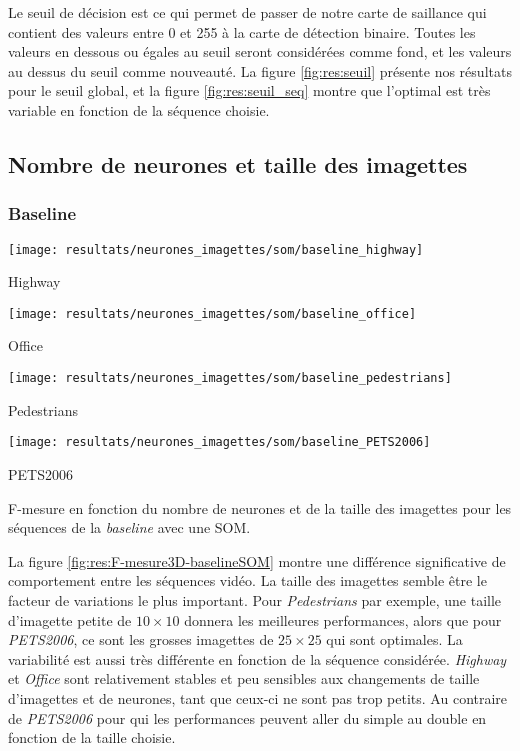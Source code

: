 	Le seuil de décision est ce qui permet de passer de notre carte de saillance qui contient des valeurs entre 0 et 255 à la carte de détection binaire. Toutes les valeurs en dessous ou égales au seuil seront considérées comme fond, et les valeurs au dessus du seuil comme nouveauté. La figure \ref{fig:res:seuil} présente nos résultats pour le seuil global, et la figure \ref{fig:res:seuil_seq} montre que l'optimal est très variable en fonction de la séquence choisie.

	\subsection{Nombre de neurones et taille des imagettes}

	\subsubsection{Baseline}

	\begin{figureth}
		\begin{subfigureth}{.45\textwidth}
			\texttt{[image: resultats/neurones\_imagettes/som/baseline\_highway]}\caption{Highway}
		\end{subfigureth}
		\begin{subfigureth}{.45\textwidth}
			\texttt{[image: resultats/neurones\_imagettes/som/baseline\_office]}\caption{Office}
		\end{subfigureth}
		\begin{subfigureth}{.45\textwidth}
			\texttt{[image: resultats/neurones\_imagettes/som/baseline\_pedestrians]}\caption{Pedestrians}
		\end{subfigureth}
		\begin{subfigureth}{.45\textwidth}
			\texttt{[image: resultats/neurones\_imagettes/som/baseline\_PETS2006]}\caption{PETS2006}
		\end{subfigureth}
		\caption[Nombre de neurones et de taille des imagettes, SOM/baseline]{F-mesure en fonction du nombre de neurones et de la taille des imagettes pour les séquences de la \textit{baseline} avec une SOM.}\label{fig:res:F-mesure3D-baselineSOM}
	\end{figureth}

	La figure \ref{fig:res:F-mesure3D-baselineSOM} montre une différence significative de comportement entre les séquences vidéo. La taille des imagettes semble être le facteur de variations le plus important. Pour \textit{Pedestrians} par exemple, une taille d'imagette petite de $10\times10$ donnera les meilleures performances, alors que pour \textit{PETS2006}, ce sont les grosses imagettes de $25\times25$ qui sont optimales. La variabilité est aussi très différente en fonction de la séquence considérée. \textit{Highway} et \textit{Office} sont relativement stables et peu sensibles aux changements de taille d'imagettes et de neurones, tant que ceux-ci ne sont pas trop petits. Au contraire de \textit{PETS2006} pour qui les performances peuvent aller du simple au double en fonction de la taille choisie.


